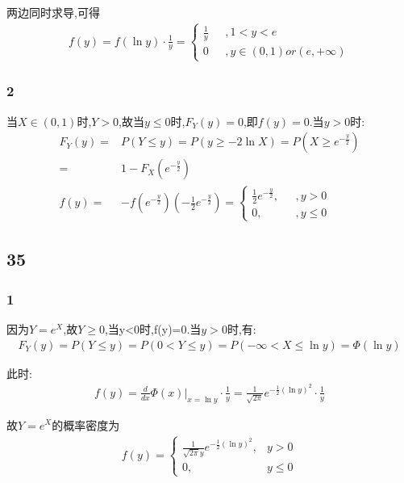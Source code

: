 \documentclass[12pt,a4paper,fontset=none]{ctexart}
\begin{document}
两边同时求导,可得
\begin{align*}
    f(y)=f(\ln y)\cdot \frac{1}{y}=
    \begin{cases}
        \frac{1}{y} \text{ } & ,1<y<e                   \\
        0 \text{ }           & ,y\in (0,1)or(e,+\infty)
    \end{cases}
\end{align*}
\subsubsection*{2}
当$X\in(0,1)$时,$Y>0$,故当$y\leq 0$时,$F_Y(y)=0$,即$f(y)=0$.当$y>0$时:
\begin{align*}
    F_Y(y)= & P(Y\leq y)=P(y\geq -2\ln X)=P(X\geq e^{-\frac{y}{2} }) \\=&1-F_X(e^{-\frac{y}{2} })\\
    f(y)=   & -f(e^{-\frac{y}{2} })(-\frac{1}{2}e^{-\frac{y}{2} } )=
    \begin{cases}
        \frac{1}{2} e^{-\frac{y}{2} },\text{ } & ,y>0     \\
        0,\text{ }                             & ,y\leq 0
    \end{cases}
\end{align*}
\subsection*{35}
\subsubsection*{1}
因为$Y=e^X$,故$Y\geq 0$,当y<0时,f(y)=0.当$y>0$时,有:
\begin{align*}
    F_Y(y)=P(Y\leq y)=P(0<Y\leq y)=P(-\infty<X\leq \ln y)=\varPhi(\ln y)
\end{align*}

此时:
\begin{align*}
    f(y)=\frac{d}{dx} \varPhi(x)\bigg|_{x=\ln y}\cdot \frac{1}{y} =\frac{1}{\sqrt{2\pi}}e^{-\frac{1}{2}(\ln y)^2 }\cdot \frac{1}{y}
\end{align*}

故$Y=e^X$的概率密度为
\begin{align*}
    f(y)=\begin{cases}
        \frac{1}{\sqrt{2\pi}y}e^{-\frac{1}{2}(\ln y)^2 }, & y>0     \\
        0,                                                & y\leq 0
    \end{cases}
\end{align*}
\end{document}
